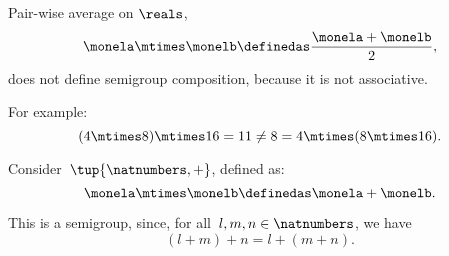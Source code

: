 \begin{example}
    Pair-wise average on $\reals$,
    \begin{equation}
        \label{eq:pairwise}
        \monela \mtimes \monelb \definedas  \frac{\monela + \monelb}{2},
    \end{equation}
    does not define semigroup composition, because it is not associative.

    For example:
    \begin{equation}
        \label{eq:pairwise-counterexample}
        (4 \mtimes 8) \mtimes 16 = 11 \neq  8 = 4 \mtimes (8 \mtimes 16).
    \end{equation}
\end{example}



\begin{example}
    \label{exa:natnum-semigroup}
    Consider~$\tup{\natnumbers,+}$, defined as:
    \begin{equation*}
        \label{eq:natnum-semigroup-definition}
        \monela \mtimes \monelb \definedas  \monela + \monelb.
    \end{equation*}

    This is a semigroup, since, for all~$l,m, n \in \natnumbers$, we have
    \begin{equation}
    (l+m)
        +n
        =l+(m+n).
    \end{equation}
\end{example}



